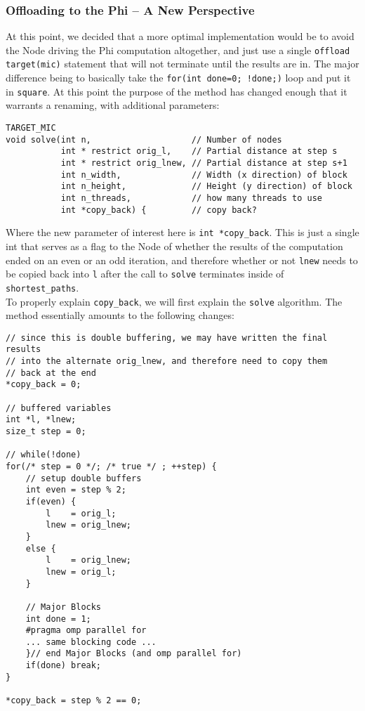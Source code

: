 \documentclass[11pt]{article}
\begin{document}
\subsubsection{Offloading to the Phi -- A New Perspective}

\noindent At this point, we decided that a more optimal implementation would be to avoid the Node driving the Phi computation altogether, and just use a single \texttt{offload target(mic)} statement that will not terminate until the results are in.  The major difference being to basically take the \texttt{for(int done=0; !done;)} loop and put it in \texttt{square}.  At this point the purpose of the method has changed enough that it warrants a renaming, with additional parameters:

\begin{lstlisting}
TARGET_MIC
void solve(int n,                    // Number of nodes
           int * restrict orig_l,    // Partial distance at step s
           int * restrict orig_lnew, // Partial distance at step s+1
           int n_width,              // Width (x direction) of block
           int n_height,             // Height (y direction) of block
           int n_threads,            // how many threads to use
           int *copy_back) {         // copy back? 	
\end{lstlisting}

\noindent Where the new parameter of interest here is \texttt{int *copy\_back}.  This is just a single int that serves as a flag to the Node of whether the results of the computation ended on an even or an odd iteration, and therefore whether or not \texttt{lnew} needs to be copied back into \texttt{l} after the call to \texttt{solve} terminates inside of \texttt{shortest\_paths}.\\

\noindent To properly explain \texttt{copy\_back}, we will first explain the \texttt{solve} algorithm.  The method essentially amounts to the following changes:

\begin{lstlisting}
// since this is double buffering, we may have written the final results 
// into the alternate orig_lnew, and therefore need to copy them
// back at the end
*copy_back = 0;

// buffered variables
int *l, *lnew;
size_t step = 0;

// while(!done)
for(/* step = 0 */; /* true */ ; ++step) {
    // setup double buffers
    int even = step % 2;
    if(even) {
        l    = orig_l;
        lnew = orig_lnew;
    }
    else {
        l    = orig_lnew;
        lnew = orig_l;
    }

    // Major Blocks
    int done = 1;
    #pragma omp parallel for
    ... same blocking code ...
    }// end Major Blocks (and omp parallel for)
    if(done) break;
}

*copy_back = step % 2 == 0;
\end{lstlisting}
\end{document}
